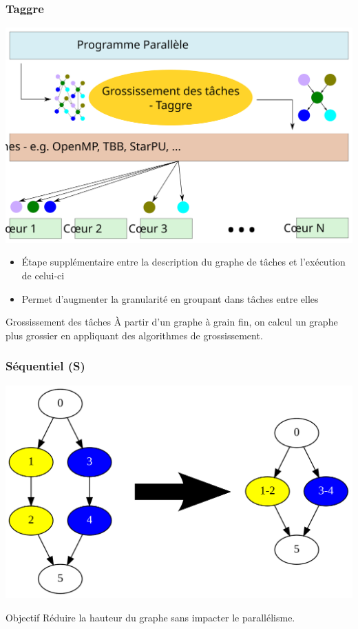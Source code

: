 \documentclass{beamer}
\begin{document}
\begin{frame}
  \frametitle{Taggre}

  \centerline{\includegraphics[width=0.55\linewidth]{coarsening}}

  \begin{itemize}
    \item \'Etape supplémentaire entre la description du graphe de tâches et l'exécution de celui-ci
    \item Permet d'augmenter la granularité en groupant dans tâches entre elles
  \end{itemize}

  \begin{block}{Grossissement des tâches}
    \`A partir d'un graphe à grain fin, on calcul un graphe plus grossier en appliquant
    des algorithmes de grossissement.
  \end{block}
\end{frame}



\begin{frame}
  \frametitle{Séquentiel (S)}

  \centerline{\includegraphics[width=0.80\linewidth]{algo_S}}

  \begin{block}{Objectif}
    Réduire la hauteur du graphe sans impacter le parallélisme.
  \end{block}
\end{frame}
\end{document}

